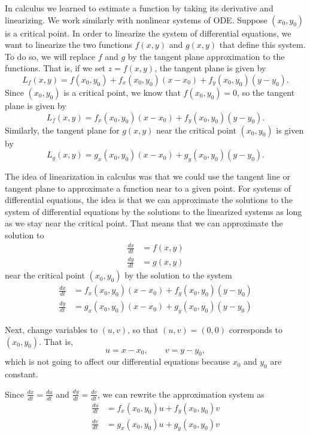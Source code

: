 In calculus we learned to estimate a function by taking its
derivative and linearizing.  We work similarly with nonlinear systems of ODE.
Suppose $(x_0,y_0)$ is a critical point. In order to linearize the system of differential equations, we want to linearize the two functions $f(x,y)$ and $g(x,y)$ that define this system. To do so, we will replace $f$ and $g$ by the tangent plane approximation to the functions. That is, if we set $z = f(x,y)$, the tangent plane is given by
\[ L_f(x,y) = f(x_0, y_0) + f_x(x_0, y_0)(x - x_0) + f_y(x_0, y_0)(y - y_0). \] Since $(x_0, y_0)$ is a critical point, we know that $f(x_0, y_0) = 0$, so the tangent plane is given by 
\[ L_f(x,y) = f_x(x_0, y_0)(x - x_0) + f_y(x_0, y_0)(y - y_0). \]
Similarly, the tangent plane for $g(x,y)$ near the critical point $(x_0, y_0)$ is given by 
\[ L_g(x,y) = g_x(x_0, y_0)(x - x_0) + g_y(x_0, y_0)(y - y_0). \]

The idea of linearization in calculus was that we could use the tangent line or tangent plane to approximate a function near to a given point. For systems of differential equations, the idea is that we can approximate the solutions to the system of differential equations by the solutions to the linearized systems as long as we stay near the critical point. That means that we can approximate the solution to
\[
\begin{split}
\frac{dx}{dt} &= f(x,y) \\
\frac{dy}{dt} &= g(x,y)
\end{split}
\]
near the critical point $(x_0, y_0)$ by the solution to the system
\[
\begin{split}
\frac{dx}{dt} &= f_x(x_0, y_0)(x - x_0) + f_y(x_0, y_0)(y - y_0) \\
\frac{dy}{dt} &= g_x(x_0, y_0)(x - x_0) + g_y(x_0, y_0)(y - y_0)
\end{split}
\]

Next, change variables to $(u,v)$, so that $(u,v)=(0,0)$ corresponds to
$(x_0,y_0)$.  That is,
\begin{equation*}
u=x-x_0, \qquad v=y-y_0,
\end{equation*}
which is not going to affect our differential equations because $x_0$ and $y_0$ are constant. 

Since $\frac{dx}{dt} = \frac{du}{dt}$ and $\frac{dy}{dt} = \frac{dv}{dt}$, we can rewrite the approximation system as 
\[
\begin{split}
\frac{du}{dt} &= f_x(x_0, y_0)u + f_y(x_0, y_0)v \\
\frac{dv}{dt} &= g_x(x_0, y_0)u + g_y(x_0, y_0)v
\end{split}
\]

